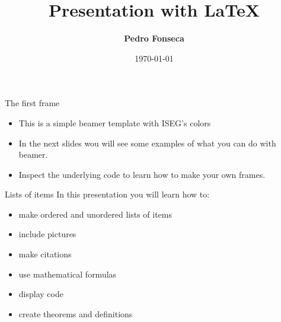 


\title[Presentation with LaTeX]{Presentation with \LaTeX}

\author[Pedro Fonseca]{\textbf {Pedro Fonseca}}

\date{\today}








\begin{frame}{The first frame}
	\begin{itemize}
		\item This is a simple beamer template with ISEG's colors
		\item In the next slides wou will see some examples of what you can do with beamer.
		\item Inspect the underlying code to learn how to make your own frames.
	\end{itemize}
\end{frame}


\begin{frame}{Lists of items}
	In this presentation you will learn how to:
	\begin{itemize}
	\item make ordered and unordered lists of items
	\item include pictures
	\item make citations
	\item use mathematical formulas
	\item display code
	\item create theorems and definitions
	\end{itemize}
\end{frame}

